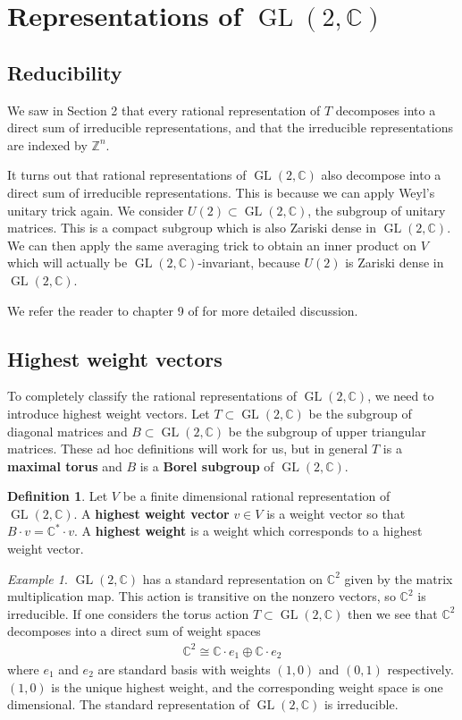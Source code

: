 \documentclass{amsart}
\DeclareMathOperator{\GL}{GL}
\newcommand{\C}{\mathbb{C}}
\newcommand{\Z}{\mathbb{Z}}
\numberwithin{equation}{section}
\theoremstyle{plain} %
\theoremstyle{definition}
\newtheorem{definition}[equation]{Definition}
\theoremstyle{remark}
\newtheorem{example}[equation]{Example}
\begin{document}
\section{Representations of $\GL(2,\C)$}

\subsection{Reducibility}
We saw in Section 2 that every rational representation of $T$ decomposes into a direct sum of irreducible representations,
and that the irreducible representations are indexed by $\Z^n$.

\hfill

It turns out that rational representations of $\GL(2,\C)$
also decompose into a direct sum of irreducible representations. This is
because we can apply Weyl's unitary trick again. We consider $U(2)\subset \GL(2,\C)$, the subgroup of unitary matrices.
This is a compact subgroup which is also Zariski dense in $\GL(2,\C)$. We can then apply the same averaging trick
to obtain an inner product on $V$ which will actually be $\GL(2,\C)$-invariant, because $U(2)$ is Zariski dense in $\GL(2,\C)$.

\hfill 

We refer the reader to chapter 9 of \cite{fulton-harris} for more detailed discussion.


\subsection{Highest weight vectors}
To completely classify the rational representations of $\GL(2,\C)$, we need to introduce highest weight vectors.
Let $T\subset \GL(2,\C)$ be the subgroup of diagonal matrices and $B \subset \GL(2,\C)$ be the subgroup of upper triangular matrices.
These ad hoc definitions will work for us, but in general $T$ is a \textbf{maximal torus} and $B$ is a \textbf{Borel subgroup} of $\GL(2,\C)$.
\begin{definition}
	Let $V$ be a finite dimensional rational representation of $\GL(2,\C)$. A \textbf{highest weight vector} $v\in V$ is
	a weight vector so that $B\cdot v = \C^*\cdot v$. A \textbf{highest weight} is a weight which
	corresponds to a highest weight vector.
\end{definition}

\begin{example}
	$\GL(2,\C)$ has a standard representation on $\C^2$ given by the matrix multiplication map. This action
	is transitive on the nonzero vectors, so $\C^2$ is irreducible. If one considers the torus action $T\subset \GL(2,\C)$
	then we see that $\C^2$ decomposes into a direct sum of weight spaces \begin{align*}
		\C^2 \cong \C\cdot e_1 \oplus \C\cdot e_2
	\end{align*} where $e_1$ and $e_2$ are standard basis with weights $(1,0)$ and $(0,1)$ respectively.
	$(1,0)$ is the unique highest weight, and the corresponding weight space is one dimensional. The standard
	representation of $\GL(2,\C)$ is irreducible.
\end{example}
\end{document}
